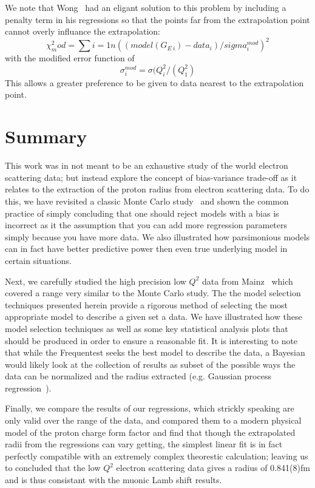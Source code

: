 \documentclass[10pt,aps,prc,twocolumn]{revtex4-1}
\begin{document}
We note that Wong~\cite{Wong:1994sy} had an eligant solution to this problem by including a penalty 
term in his regressions so that the points far from the extrapolation point cannot overly influance 
the extrapolation:
\begin{equation}
\chi^2_mod = \sum{i=1}{n} ((model(G_{E~i})-data_i)/sigma_i^{mod})^2
\end{equation}
with the modified error function of
\begin{equation}
\sigma_i^{mod} = \sigma (Q^2_i/(Q^2_1)
\end{equation}
This allows a greater preference to be given to data nearest to the extrapolation point.


\section{Summary}

This work was in not meant to be an exhaustive study of the world electron scattering data; but 
instead explore the concept of bias-variance trade-off as it relates to the extraction of the proton 
radius from electron scattering data.
To do this, we have revisited a classic Monte Carlo study~\cite{Borkowski:1975ume} and shown
the common practice of simply concluding that one should reject models with a bias is incorrect
as it the assumption that you can add more regression parameters simply because you have more data.  
We also illustrated how parsimonious models can in fact have better 
predictive power then even true underlying model in certain situations. 

Next, we carefully studied the high precision low $Q^2$ data from Mainz~\cite{} which covered a range
very similar to the Monte Carlo study.  The the model selection techniques
presented herein provide a rigorous method of selecting the most appropriate model to describe a given
set a data.  We have illustrated how these model selection techniques as well as some key statistical 
analysis plots that should be produced in order to ensure a reasonable fit.   
It is interesting to note that while the Frequentest
seeks the best model to describe the data, a Bayesian would likely look at the collection of results as  
subset of the possible ways the data can be normalized and the radius extracted (e.g. Gaussian process 
regression~\cite{Rasmussen:2005}).    

Finally, we compare the results of our regressions, which strickly speaking are only valid over the
range of the data, and compared them to a modern physical model of the proton charge form factor
and find that though the extrapolated radii from the regressions can vary getting, the simplest
linear fit is in fact perfectly compatible with an extremely complex theorestic calculation; leaving
us to concluded that the low $Q^2$ electron scattering data gives a radius of 0.841(8)fm and is thus
consistant with the muonic Lamb shift results.
\end{document}
